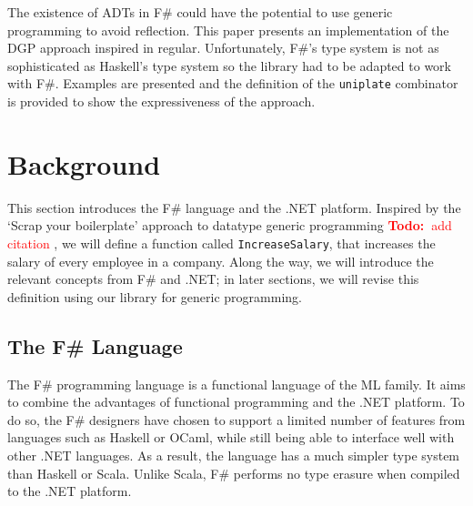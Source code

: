 \documentclass{sigplanconf}
\newcommand{\todo}[1]{
\ifthenelse
  {\boolean{showNotes}}
  {\textcolor{red}{\textbf{Todo:~}#1}}
  {}}
\begin{document}
The existence of ADTs in F\# could have the potential to use
generic programming to avoid reflection. This paper presents an
implementation of the DGP approach inspired in regular\cite{regular}.
Unfortunately, F\#'s type system is not as sophisticated as
Haskell's type system so the library had to be adapted to
work with F\#. Examples are presented and the definition of
the \verb+uniplate+ combinator is provided to show the expressiveness
of the approach.

\section{Background}
This section introduces the F\# language and the .NET
platform. Inspired by the `Scrap your boilerplate' approach to
datatype generic programming \todo{add citation}, we will define a
function called \verb+IncreaseSalary+, that increases the salary of
every employee in a company. Along the way, we will introduce the
relevant concepts from F\# and .NET; in later sections, we will revise
this definition using our library for generic programming.

\subsection{The F\# Language}
The F\# programming language is a functional language of the ML
family. It aims to combine the advantages of
functional programming and the .NET platform. To do so, the F\# designers
have chosen to support a limited number of features from languages such as Haskell or OCaml, 
while still being able to interface well with other .NET languages.
As a result, the language
has a much simpler type system than Haskell or Scala.
Unlike Scala, F\# performs no type erasure when compiled
to the .NET platform.
\end{document}
